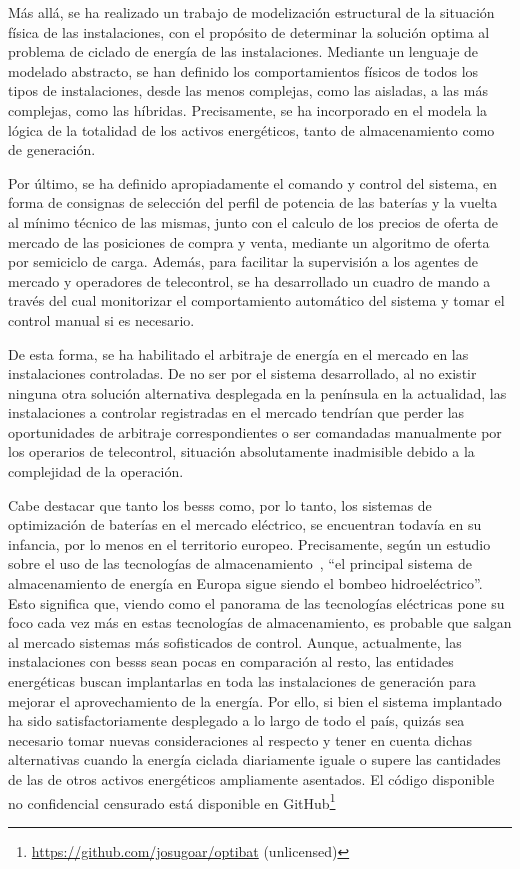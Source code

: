 Más allá, se ha realizado un trabajo de modelización estructural de la situación física de las instalaciones, con el propósito de determinar la solución optima al problema de ciclado de energía de las instalaciones. Mediante un lenguaje de modelado abstracto, se han definido los comportamientos físicos de todos los tipos de instalaciones, desde las menos complejas, como las aisladas, a las más complejas, como las híbridas. Precisamente, se ha incorporado en el modela la lógica de la totalidad de los activos energéticos, tanto de almacenamiento como de generación.

Por último, se ha definido apropiadamente el comando y control del sistema, en forma de consignas de selección del perfil de potencia de las baterías y la vuelta al mínimo técnico de las mismas, junto con el calculo de los precios de oferta de mercado de las posiciones de compra y venta, mediante un algoritmo de oferta por semiciclo de carga. Además, para facilitar la supervisión a los agentes de mercado y operadores de telecontrol, se ha desarrollado un cuadro de mando a través del cual monitorizar el comportamiento automático del sistema y tomar el control manual si es necesario.

De esta forma, se ha habilitado el arbitraje de energía en el mercado en las instalaciones controladas. De no ser por el sistema desarrollado, al no existir ninguna otra solución alternativa desplegada en la península en la actualidad, las instalaciones a controlar registradas en el mercado tendrían que perder las oportunidades de arbitraje correspondientes o ser comandadas manualmente por los operarios de telecontrol, situación absolutamente inadmisible debido a la complejidad de la operación.

Cabe destacar que tanto los \glspl{bess} como, por lo tanto, los sistemas de optimización de baterías en el mercado eléctrico, se encuentran todavía en su infancia, por lo menos en el territorio europeo. Precisamente, según un estudio sobre el uso de las tecnologías de almacenamiento~\cite{hu2022potential}, ``el principal sistema de almacenamiento de energía en Europa sigue siendo el bombeo hidroeléctrico''. Esto significa que, viendo como el panorama de las tecnologías eléctricas pone su foco cada vez más en estas tecnologías de almacenamiento, es probable que salgan al mercado sistemas más sofisticados de control. Aunque, actualmente, las instalaciones con \glspl{bess} sean pocas en comparación al resto, las entidades energéticas buscan implantarlas en toda las instalaciones de generación para mejorar el aprovechamiento de la energía. Por ello, si bien el sistema implantado ha sido satisfactoriamente desplegado a lo largo de todo el país, quizás sea necesario tomar nuevas consideraciones al respecto y tener en cuenta dichas alternativas cuando la energía ciclada diariamente iguale o supere las cantidades de las de otros activos energéticos ampliamente asentados. El código disponible no confidencial censurado está disponible en GitHub\footnote{\url{https://github.com/josugoar/optibat} (unlicensed)}

